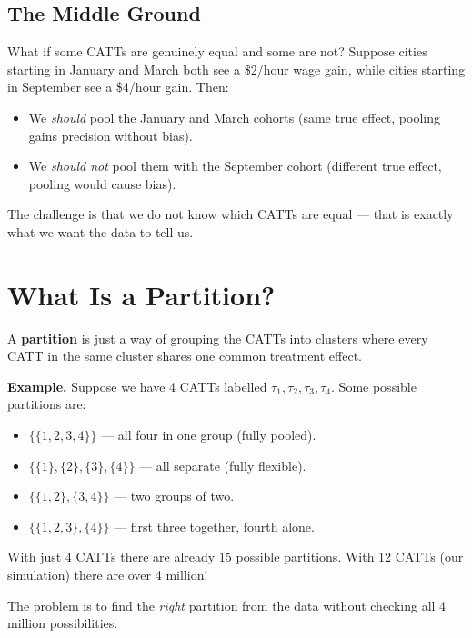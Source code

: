 \documentclass[12pt]{article}
\begin{document}
\subsection{The Middle Ground}

What if some CATTs are genuinely equal and some are not? Suppose cities starting
in January and March both see a \$2/hour wage gain, while cities starting in
September see a \$4/hour gain. Then:
\begin{itemize}
  \item We \textit{should} pool the January and March cohorts (same true effect,
    pooling gains precision without bias).
  \item We \textit{should not} pool them with the September cohort (different
    true effect, pooling would cause bias).
\end{itemize}

The challenge is that we do not know which CATTs are equal --- that is exactly
what we want the data to tell us.

\section{What Is a Partition?}

A \textbf{partition} is just a way of grouping the CATTs into clusters where
every CATT in the same cluster shares one common treatment effect.

\begin{examplebox}
\textbf{Example.} Suppose we have 4 CATTs labelled $\tau_1, \tau_2, \tau_3,
\tau_4$. Some possible partitions are:
\begin{itemize}[nosep]
  \item $\{\{1,2,3,4\}\}$ --- all four in one group (fully pooled).
  \item $\{\{1\},\{2\},\{3\},\{4\}\}$ --- all separate (fully flexible).
  \item $\{\{1,2\},\{3,4\}\}$ --- two groups of two.
  \item $\{\{1,2,3\},\{4\}\}$ --- first three together, fourth alone.
\end{itemize}
With just 4 CATTs there are already 15 possible partitions. With 12 CATTs
(our simulation) there are over 4 million!
\end{examplebox}

The problem is to find the \textit{right} partition from the data without
checking all 4 million possibilities.
\end{document}

